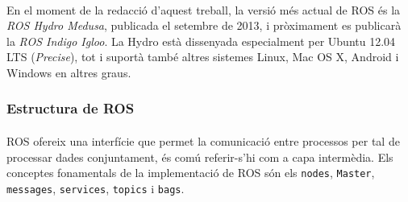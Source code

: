 \documentclass[12pt,a4paper,final,twoside]{article}
\begin{document}
\paragraph{}En el moment de la redacció d'aquest treball, la versió més actual de ROS és la \textit{ROS Hydro Medusa}, publicada el setembre de 2013, i pròximament es publicarà la \textit{ROS Indigo Igloo}. La Hydro està dissenyada especialment per Ubuntu 12.04 LTS (\textit{Precise}), tot i suportà també altres sistemes Linux, Mac OS X, Android i Windows en altres graus.


\subsubsection{Estructura de ROS}
\paragraph{}ROS ofereix una interfície que permet la comunicació entre processos per tal de processar dades conjuntament, és comú referir-s'hi com a capa intermèdia. Els conceptes fonamentals de la implementació de ROS són els \texttt{nodes}, \texttt{Master}, \texttt{messages}, \texttt{services}, \texttt{topics} i \texttt{bags}.
\end{document}

